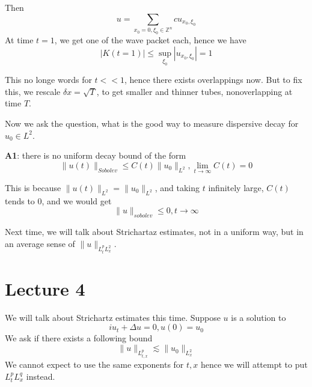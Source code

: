 Then
\begin{equation*}
    u=\sum_{x_0=0,\xi_0\in\mathbb{Z}^n}c u_{x_0, \xi_0}
\end{equation*}
At time $t=1$, we get one of the wave packet each, hence we have
\begin{equation*}
    |K(t=1)|\leq \sup_{\xi_0}|u_{x_0,\xi_0}|=1
\end{equation*}
\begin{remark}
    This no longe words for $t<<1$, hence there exists overlappings now. But to fix this, we rescale $\delta x=\sqrt{T}$, to get smaller and thinner tubes, nonoverlapping at time $T$.
\end{remark}

Now we ask the question, what is the good way to measure dispersive decay for $u_0\in L^2$.

\textbf{A1}: there is no uniform decay bound of the form
\begin{equation*}
    \|u(t)\|_{Sobolev}\leq C(t)\|u_0\|_{L^2}, \lim_{t\to\infty}C(t)=0
\end{equation*}

This is because $\|u(t)\|_{L^2}=\|u_0\|_{L^2}$, and taking $t$ infinitely large, $C(t)$ tends to 0, and we would get 
\begin{equation*}
    \|u\|_{sobolev}\leq 0, t\to\infty
\end{equation*}

Next time, we will talk about Strichartaz estimates, not in a uniform way, but in an average sense of $\|u\|_{L_t^pL_x^2}$. 


\section{Lecture 4}
We will talk about Strichartz estimates this time. Suppose $u$ is a solution to 
\begin{equation*}
    iu_t+\Delta u=0, u(0)=u_0
\end{equation*}
We ask if there exists a following bound
\begin{equation*}
    \|u\|_{L_{t,x}^p}\lesssim \|u_0\|_{L_x^2}
\end{equation*}
We cannot expect to use the same exponents for $t,x$ hence we will attempt to put $L_t^pL_x^q$ instead.

